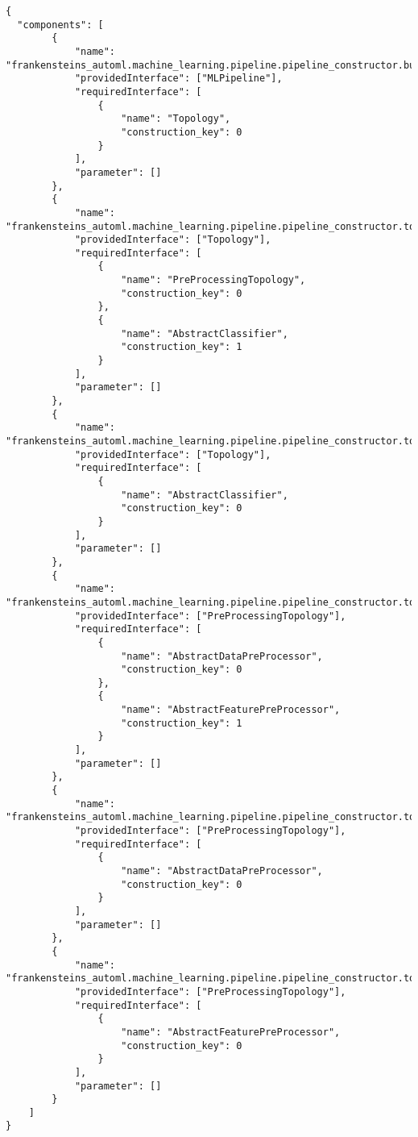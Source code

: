 \begin{Verbatim}[fontsize=\scriptsize]
{
  "components": [
        {
            "name": "frankensteins_automl.machine_learning.pipeline.pipeline_constructor.build_topology",
            "providedInterface": ["MLPipeline"],
            "requiredInterface": [
                {
                    "name": "Topology",
                    "construction_key": 0
                }
            ],
            "parameter": []
        },
        {
            "name": "frankensteins_automl.machine_learning.pipeline.pipeline_constructor.topology_union",
            "providedInterface": ["Topology"],
            "requiredInterface": [
                {
                    "name": "PreProcessingTopology",
                    "construction_key": 0
                },
                {
                    "name": "AbstractClassifier",
                    "construction_key": 1
                }
            ],
            "parameter": []
        },
        {
            "name": "frankensteins_automl.machine_learning.pipeline.pipeline_constructor.topology_union",
            "providedInterface": ["Topology"],
            "requiredInterface": [
                {
                    "name": "AbstractClassifier",
                    "construction_key": 0
                }
            ],
            "parameter": []
        },
        {
            "name": "frankensteins_automl.machine_learning.pipeline.pipeline_constructor.topology_union",
            "providedInterface": ["PreProcessingTopology"],
            "requiredInterface": [
                {
                    "name": "AbstractDataPreProcessor",
                    "construction_key": 0
                },
                {
                    "name": "AbstractFeaturePreProcessor",
                    "construction_key": 1
                }
            ],
            "parameter": []
        },
        {
            "name": "frankensteins_automl.machine_learning.pipeline.pipeline_constructor.topology_union",
            "providedInterface": ["PreProcessingTopology"],
            "requiredInterface": [
                {
                    "name": "AbstractDataPreProcessor",
                    "construction_key": 0
                }
            ],
            "parameter": []
        },
        {
            "name": "frankensteins_automl.machine_learning.pipeline.pipeline_constructor.topology_union",
            "providedInterface": ["PreProcessingTopology"],
            "requiredInterface": [
                {
                    "name": "AbstractFeaturePreProcessor",
                    "construction_key": 0
                }
            ],
            "parameter": []
        }
    ]
}
\end{Verbatim}

